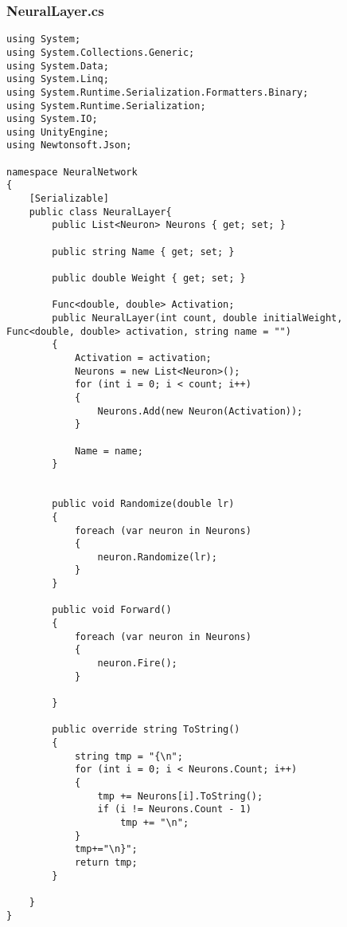 \documentclass[12pt,a4paper]{article}
\begin{document}
\subsubsection*{NeuralLayer.cs}
\begin{lstlisting}
using System;
using System.Collections.Generic;
using System.Data;
using System.Linq;
using System.Runtime.Serialization.Formatters.Binary;
using System.Runtime.Serialization;
using System.IO;
using UnityEngine;
using Newtonsoft.Json;

namespace NeuralNetwork
{
    [Serializable]
    public class NeuralLayer{
        public List<Neuron> Neurons { get; set; }

        public string Name { get; set; }

        public double Weight { get; set; }

        Func<double, double> Activation;
        public NeuralLayer(int count, double initialWeight, Func<double, double> activation, string name = "")
        {
            Activation = activation;
            Neurons = new List<Neuron>();
            for (int i = 0; i < count; i++)
            {
                Neurons.Add(new Neuron(Activation));
            }

            Name = name;
        }


        public void Randomize(double lr)
        {
            foreach (var neuron in Neurons)
            {
                neuron.Randomize(lr);
            }
        }

        public void Forward()
        {
            foreach (var neuron in Neurons)
            {
                neuron.Fire();
            }
            
        }

        public override string ToString()
        {
            string tmp = "{\n";
            for (int i = 0; i < Neurons.Count; i++)
            {
                tmp += Neurons[i].ToString();
                if (i != Neurons.Count - 1)
                    tmp += "\n";
            }
            tmp+="\n}";
            return tmp;
        }

    }
}






\end{lstlisting}
\pagebreak
\end{document}
